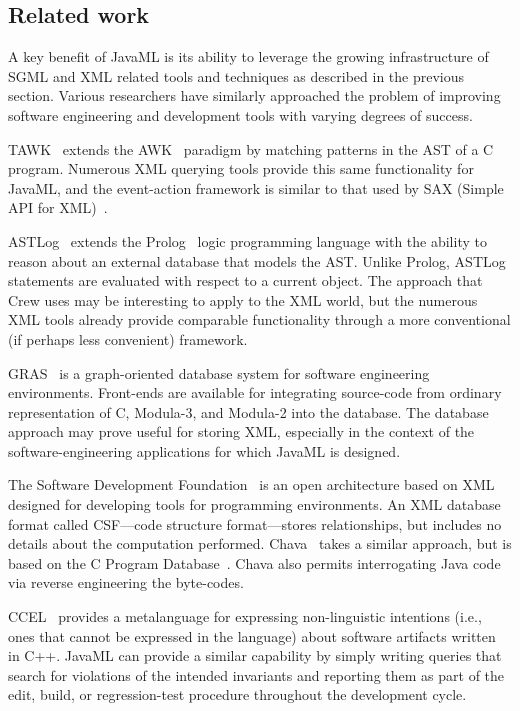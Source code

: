 \documentclass{article}
\begin{document}
\begin{multicols}{2}
\section{Related work}
\label{sec-related}

A key benefit of JavaML is its ability to leverage the growing
infrastructure of SGML and XML related tools and techniques as described
in the previous section.  Various researchers have similarly approached
the problem of improving software engineering and development tools with
varying degrees of success.

TAWK~\cite{Griswold96} extends the AWK~\cite{Dougherty90} paradigm by matching
patterns in the AST of a C program.  Numerous XML querying tools provide
this same functionality for JavaML, and the event-action framework is
similar to that used by SAX (Simple API for XML)~\cite{SAX}.

ASTLog~\cite{Crew97} extends the Prolog~\cite{Clock94} logic programming
language with the ability to reason about an external database that
models the AST.  Unlike Prolog, ASTLog statements are evaluated with
respect to a current object.  The approach that Crew uses may be
interesting to apply to the XML world, but the numerous XML tools
already provide comparable functionality through a more conventional (if
perhaps less convenient) framework.

GRAS~\cite{Kiesel95} is a graph-oriented database system for software engineering
environments.  Front-ends are available for integrating source-code from
ordinary representation of C, Modula-3, and Modula-2 into the database.  The database 
approach may prove useful for storing XML, especially in the context of
the software-engineering applications for which JavaML is designed.

The Software Development Foundation~\cite{SDS} is an open
architecture based on XML designed for developing tools for programming
environments.  An XML database format called
CSF---code structure format---stores relationships, but includes no
details about the computation performed.  Chava~\cite{Chava} takes a
similar approach, but is based on the C Program Database~\cite{Chen89}.
Chava also permits interrogating Java code via reverse
engineering the byte-codes.

CCEL~\cite{CCEL92} provides a metalanguage for expressing non-linguistic
intentions (i.e., ones that cannot be expressed in the language) about
software artifacts written in C++.  JavaML can provide a similar
capability by simply writing queries that search for violations of the
intended invariants and reporting them as part of the edit, build, or
regression-test procedure throughout the development cycle.


\end{multicols}
\end{document}
